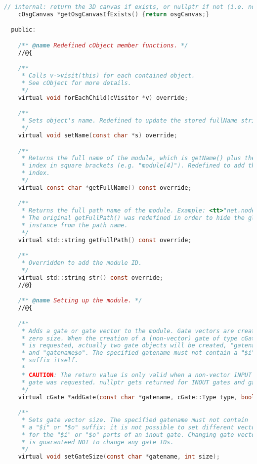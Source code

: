 \begin{lstlisting}[language=c]
    // internal: return the 3D canvas if exists, or nullptr if not (i.e. no create-on-demand)
    cOsgCanvas *getOsgCanvasIfExists() {return osgCanvas;}

  public:

    /** @name Redefined cObject member functions. */
    //@{

    /**
     * Calls v->visit(this) for each contained object.
     * See cObject for more details.
     */
    virtual void forEachChild(cVisitor *v) override;

    /**
     * Sets object's name. Redefined to update the stored fullName string.
     */
    virtual void setName(const char *s) override;

    /**
     * Returns the full name of the module, which is getName() plus the
     * index in square brackets (e.g. "module[4]"). Redefined to add the
     * index.
     */
    virtual const char *getFullName() const override;

    /**
     * Returns the full path name of the module. Example: <tt>"net.node[12].gen"</tt>.
     * The original getFullPath() was redefined in order to hide the global cSimulation
     * instance from the path name.
     */
    virtual std::string getFullPath() const override;

    /**
     * Overridden to add the module ID.
     */
    virtual std::string str() const override;
    //@}

    /** @name Setting up the module. */
    //@{

    /**
     * Adds a gate or gate vector to the module. Gate vectors are created with
     * zero size. When the creation of a (non-vector) gate of type cGate::INOUT
     * is requested, actually two gate objects will be created, "gatename$i"
     * and "gatename$o". The specified gatename must not contain a "$i" or "$o"
     * suffix itself.
     *
     * CAUTION: The return value is only valid when a non-vector INPUT or OUTPUT
     * gate was requested. nullptr gets returned for INOUT gates and gate vectors.
     */
    virtual cGate *addGate(const char *gatename, cGate::Type type, bool isvector=false);

    /**
     * Sets gate vector size. The specified gatename must not contain
     * a "$i" or "$o" suffix: it is not possible to set different vector size
     * for the "$i" or "$o" parts of an inout gate. Changing gate vector size
     * is guaranteed NOT to change any gate IDs.
     */
    virtual void setGateSize(const char *gatename, int size);


\end{lstlisting}
